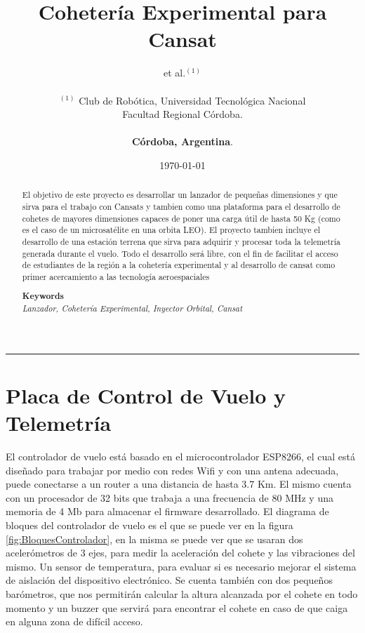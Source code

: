 \documentclass[a4paper]{article} %
\date{\today}
\def\keywords#1{\begin{center}{\bf Keywords}\\{#1}\end{center}} %
\begin{document}
\title{\textbf{Cohetería Experimental para Cansat}}

\author{et al.$^{(1)}$ \\\\
       $^{(1)}$ Club de Rob\'{o}tica, Universidad Tecnol\'{o}gica Nacional \\Facultad Regional C\'{o}rdoba. \\\\ \textbf{C\'{o}rdoba, Argentina}.\\ 
       }

\maketitle

\thispagestyle{empty}
\begin{center}\rule{0.9\textwidth}{0.1mm} \end{center} 


\begin{abstract}
El objetivo de este proyecto es desarrollar un lanzador de pequeñas dimensiones y que sirva para el trabajo con Cansats y tambien como una plataforma para el desarrollo de cohetes de mayores dimensiones capaces de poner una carga útil de hasta 50 Kg (como es el caso de un microsatélite en una orbita LEO). El proyecto tambien incluye el desarrollo de una estación terrena que sirva para adquirir y procesar toda la telemetría generada durante el vuelo. Todo el desarrollo será libre, con el fin de facilitar el acceso de estudiantes de la región a la cohetería experimental y al desarrollo de cansat como primer acercamiento a las tecnología aeroespaciales
\vspace*{.15cm}

\keywords{\textit{Lanzador, Cohetería Experimental, Inyector Orbital, Cansat}}

\vspace*{.1cm}
\end{abstract}

\section{Placa de Control de Vuelo y Telemetría}
El controlador de vuelo está basado en el microcontrolador ESP8266, el cual está diseñado para trabajar por medio con redes Wifi y con una antena adecuada, puede conectarse a un router a una distancia de hasta 3.7 Km. El mismo cuenta con un procesador de 32 bits que trabaja a una frecuencia de 80 MHz y una memoria de 4 Mb para almacenar el firmware desarrollado.
El diagrama de bloques del controlador de vuelo es el que se puede ver en la figura \ref{fig:BloquesControlador}, en la misma se puede ver que se usaran dos acelerómetros de 3 ejes, para medir la aceleración del cohete y las vibraciones del mismo. Un sensor de temperatura, para evaluar si es necesario mejorar el sistema de aislación del dispositivo electrónico. Se cuenta también con dos pequeños barómetros, que nos permitirán calcular la altura alcanzada por el cohete en todo momento y un buzzer que servirá para encontrar el cohete en caso de que caiga en alguna zona de difícil acceso.
\end{document}
